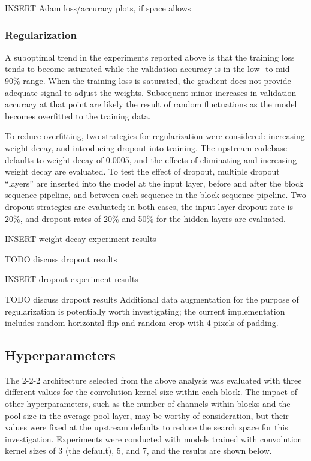 \documentclass[letterpaper]{article} %
\begin{document}
INSERT Adam loss/accuracy plots, if space allows

\subsubsection{Regularization}

A suboptimal trend in the experiments reported above is that the training loss tends to become saturated while the
validation accuracy is in the low- to mid-90\% range.
When the training loss is saturated, the gradient does not provide adequate signal to adjust the weights.
Subsequent minor increases in validation accuracy at that point are likely the result of random fluctuations as the
model becomes overfitted to the training data.

To reduce overfitting, two strategies for regularization were considered: increasing weight decay, and introducing
dropout into training.
The upstream codebase defaults to weight decay of 0.0005, and the effects of eliminating and increasing weight decay
are evaluated.
To test the effect of dropout, multiple dropout ``layers'' are inserted into the model at the input layer, before and
after the block sequence pipeline, and between each sequence in the block sequence pipeline.
Two dropout strategies are evaluated; in both cases, the input layer dropout rate is 20\%, and dropout rates of 20\%
and 50\% for the hidden layers are evaluated.

INSERT weight decay experiment results

TODO discuss dropout results

INSERT dropout experiment results

TODO discuss dropout results
Additional data augmentation for the purpose of regularization is potentially worth investigating; the current
implementation includes random horizontal flip and random crop with 4 pixels of padding.

\subsection{Hyperparameters}

The 2-2-2 architecture selected from the above analysis was evaluated with three different values for the convolution
kernel size within each block.
The impact of other hyperparameters, such as the number of channels within blocks and the pool size in the average pool
layer, may be worthy of consideration, but their values were fixed at the upstream defaults to reduce the search space
for this investigation.
Experiments were conducted with models trained with convolution kernel sizes of 3 (the default), 5, and 7, and the
results are shown below.
\end{document}
